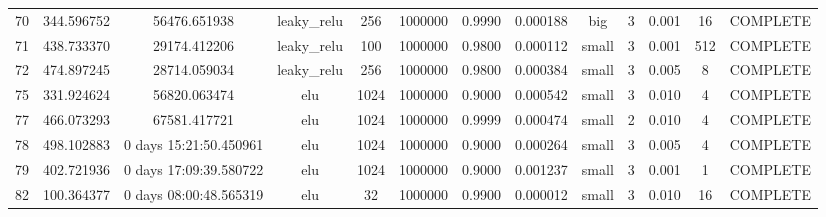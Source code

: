 \begin{longtable}{ccccccccccccc}
                       70 &                 344.596752 &                       56476.651938 &     leaky\_relu &         256 &      1000000 & 0.9990 &       0.000188 &       big &             3 & 0.001 &          16 & COMPLETE \\
                       71 &                 438.733370 &                       29174.412206 &     leaky\_relu &         100 &      1000000 & 0.9800 &       0.000112 &     small &             3 & 0.001 &         512 & COMPLETE \\
                       72 &                 474.897245 &                       28714.059034 &     leaky\_relu &         256 &      1000000 & 0.9800 &       0.000384 &     small &             3 & 0.005 &           8 & COMPLETE \\
                       75 &                 331.924624 &                       56820.063474 &             elu &        1024 &      1000000 & 0.9000 &       0.000542 &     small &             3 & 0.010 &           4 & COMPLETE \\
                       77 &                 466.073293 &                       67581.417721 &             elu &        1024 &      1000000 & 0.9999 &       0.000474 &     small &             2 & 0.010 &           4 & COMPLETE \\
                       78 &                 498.102883 &             0 days 15:21:50.450961 &             elu &        1024 &      1000000 & 0.9000 &       0.000264 &     small &             3 & 0.005 &           4 & COMPLETE \\
                       79 &                 402.721936 &             0 days 17:09:39.580722 &             elu &        1024 &      1000000 & 0.9000 &       0.001237 &     small &             3 & 0.001 &           1 & COMPLETE \\
                       82 &                 100.364377 &             0 days 08:00:48.565319 &             elu &          32 &      1000000 & 0.9900 &       0.000012 &     small &             3 & 0.010 &          16 & COMPLETE \\
\end{longtable}
